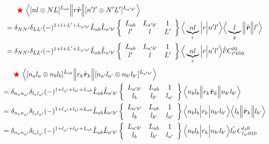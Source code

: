 \documentclass[master]{shnuthesis}
\newcommand{\bmr}{\textbf{\textit{r}}}
\newcommand{\ap}{a^\prime}
\newcommand{\bp}{b^\prime}
\newcommand{\il}{\!\!\!\!\!\!\!\!\!\!}
\newcommand{\redstar}{{\color{red} \bigstar}\,\,}
\begin{document}
\begin{align}
    & \redstar \Big\langle [n l \otimes N L]^{L_{ab}} \Big\| r\hat{\bmr} \Big\| [n^\prime l^\prime \otimes N^\prime L^\prime]^{L_{\ap\bp}} \Big\rangle \notag\\
    &\il = \delta_{NN^\prime}\delta_{LL^\prime}(-)^{1+l+L^\prime+L_{\ap\bp}} \hat{L}_{ab}\hat{L}_{\ap\bp}  \left\{\begin{array}{ccc} L_{ab} & L_{\ap\bp} & 1 \\ l^\prime & l & L^\prime \end{array}\right\}  \Big\langle \underbrace{n l}_{r} \Big| r \Big| n^\prime l^\prime \Big\rangle  \Big\langle \underbrace{l}_{\hat{\bmr}} \Big\| \hat{\bmr} \Big\| l^\prime \Big\rangle \\
    &\il = \delta_{NN^\prime}\delta_{LL^\prime}(-)^{1+l+L^\prime+L_{\ap\bp}} \hat{L}_{ab}\hat{L}_{\ap\bp}  \left\{\begin{array}{ccc} L_{ab} & L_{\ap\bp} & 1 \\ l^\prime & l & L^\prime \end{array}\right\}  \Big\langle \underbrace{n l}_{r} \Big| r \Big| n^\prime l^\prime \Big\rangle \hat{l^\prime} C_{l^\prime 0 1 0}^{l 0}
\end{align}
\begin{align}
    & \redstar \Big\langle [n_a l_a \otimes n_b l_b]^{L_{ab}} \Big\| r_k\hat{\bmr}_k \Big\| [n_{\ap} l_{\ap} \otimes n_{\bp} l_{\bp}]^{L_{\ap\bp}} \Big\rangle \notag\\
    &\il = \delta_{n_a n_{\ap}}\delta_{l_a l_{\ap}}(-)^{1+l_{\ap}+l_{\bp}+L_{ab}} \hat{L}_{ab}\hat{L}_{\ap\bp}  \left\{\begin{array}{ccc} L_{\ap\bp} & L_{ab} & 1 \\ l_b & l_{\bp} & l_{\ap} \end{array}\right\}  \Big\langle n_b l_b \Big\| r_k\hat{\bmr}_k \Big\| n_{\bp} l_{\bp} \Big\rangle \\
    &\il = \delta_{n_a n_{\ap}}\delta_{l_a l_{\ap}}(-)^{1+l_{\ap}+l_{\bp}+L_{ab}} \hat{L}_{ab}\hat{L}_{\ap\bp}  \left\{\begin{array}{ccc} L_{\ap\bp} & L_{ab} & 1 \\ l_b & l_{\bp} & l_{\ap} \end{array}\right\}  \Big\langle n_b l_b \Big| r_k \Big| n_{\bp} l_{\bp} \Big\rangle \Big\langle l_b \Big\| \hat{\bmr}_k \Big\| l_{\bp} \Big\rangle \\
    &\il = \delta_{n_a n_{\ap}}\delta_{l_a l_{\ap}}(-)^{1+l_{\ap}+l_{\bp}+L_{ab}} \hat{L}_{ab}\hat{L}_{\ap\bp}  \left\{\begin{array}{ccc} L_{\ap\bp} & L_{ab} & 1 \\ l_b & l_{\bp} & l_{\ap} \end{array}\right\}  \Big\langle n_b l_b \Big| r_k \Big| n_{\bp} l_{\bp} \Big\rangle \hat{l_{\bp}} C_{l_{\bp} 0 1 0}^{l_b 0} 
\end{align}







\end{document}
